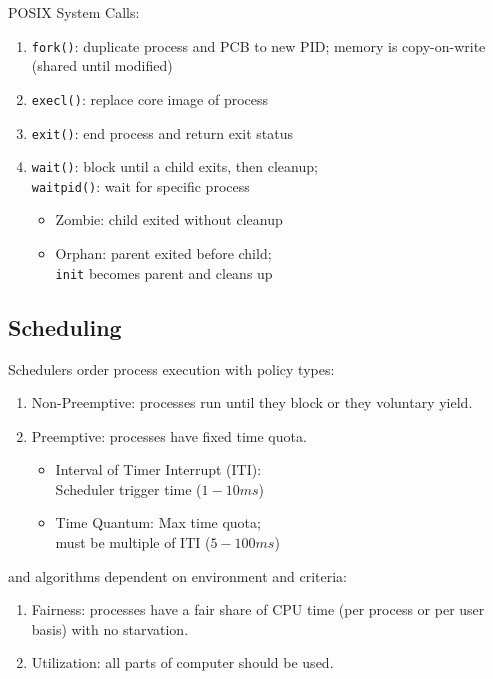 \documentclass[12pt, a4paper]{article}
\begin{document}
\begin{multicols*}{3}
POSIX System Calls:
\begin{enumerate}[\roman*.]
  \item \lstinline|fork()|: duplicate process and PCB to new PID; memory is copy-on-write (shared until modified)
  \item \lstinline|execl()|: replace core image of process 
  \item \lstinline|exit()|: end process and return exit status
  \item \lstinline|wait()|: block until a child exits, then cleanup;\\\lstinline|waitpid()|: wait for specific process\\\vspace{2pt}
    \begin{itemize}[leftmargin=*]
    \item Zombie: child exited without cleanup 
    \item Orphan: parent exited before child;\\ \lstinline|init| becomes parent and cleans up
  \end{itemize}
\end{enumerate}
\vspace{-1em}
\colbreak
\subsection{Scheduling}
Schedulers order process execution with policy types: 
\begin{enumerate}[\roman*.]
  \item Non-Preemptive: processes run until they block or they voluntary yield.
  \item Preemptive: processes have fixed time quota.
  \vspace{2pt}
  \begin{itemize}
    \item Interval of Timer Interrupt (ITI):\\Scheduler trigger time ($1-10ms$)
    \item Time Quantum: Max time quota;\\must be multiple of ITI ($5-100ms$)
  \end{itemize}
\end{enumerate}
and algorithms dependent on environment and criteria:
\begin{enumerate}[\roman*.]
  \item Fairness: processes have a fair share of CPU time (per process or per user basis) with no starvation.
  \item Utilization: all parts of computer should be used.
\end{enumerate}


\end{multicols*}
\end{document}
